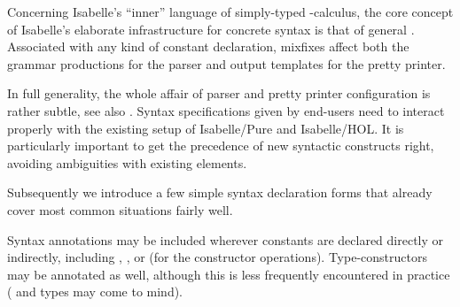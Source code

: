 %
\begin{isabellebody}%
\def\isabellecontext{Documents}%
\isamarkupfalse%
%
\isamarkuptrue%
%
\begin{isamarkuptext}%
Concerning Isabelle's ``inner'' language of simply-typed \isa{{\isasymlambda}}-calculus, the core concept of Isabelle's elaborate
  infrastructure for concrete syntax is that of general
  .  Associated with any kind of constant
  declaration, mixfixes affect both the grammar productions for the
  parser and output templates for the pretty printer.

  In full generality, the whole affair of parser and pretty printer
  configuration is rather subtle, see also \cite{isabelle-ref}.
  Syntax specifications given by end-users need to interact properly
  with the existing setup of Isabelle/Pure and Isabelle/HOL.  It is
  particularly important to get the precedence of new syntactic
  constructs right, avoiding ambiguities with existing elements.

  \medskip Subsequently we introduce a few simple syntax declaration
  forms that already cover most common situations fairly well.%
\end{isamarkuptext}%
\isamarkuptrue%
%
\isamarkuptrue%
%
\begin{isamarkuptext}%
Syntax annotations may be included wherever constants are declared
  directly or indirectly, including ,
  , or  (for the
  constructor operations).  Type-constructors may be annotated as
  well, although this is less frequently encountered in practice
  (\isa{{\isacharasterisk}} and \isa{{\isacharplus}} types may come to mind).


\end{isamarkuptext}
\end{isabellebody}

